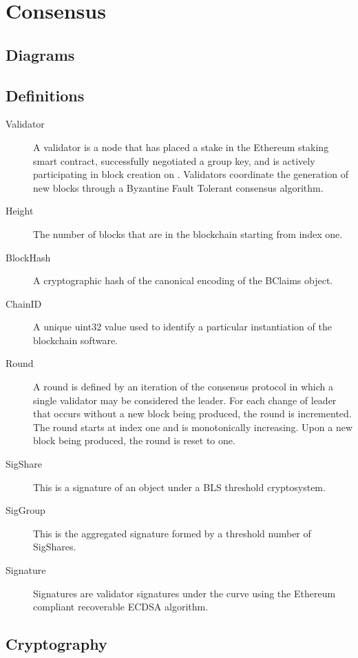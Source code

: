 \section{Consensus}

\subsection{Diagrams}



\subsection{Definitions}

\begin{description}
\item [Validator] A validator is a node that has placed a stake in the
    Ethereum staking smart contract, successfully negotiated a group key,
    and is actively participating in block creation on \LayerTwoLong{}.
    Validators coordinate the generation of new blocks through a
    Byzantine Fault Tolerant consensus algorithm.
\item [Height]
    The number of blocks that are in the blockchain starting from index one.
\item [BlockHash] A cryptographic hash of the canonical encoding
    of the BClaims object.
\item [ChainID] A unique uint32 value used to identify a particular
    instantiation of the \LayerTwoLong{} blockchain software.
\item [Round] A round is defined by an iteration of the consensus
    protocol in which a single validator may be considered the leader.
    For each change of leader that occurs without a new block being
    produced, the round is incremented.
    The round starts at index one and is monotonically increasing.
    Upon a new block being produced, the round is reset to one.
\item [SigShare] This is a signature of an object under a BLS threshold
    cryptosystem.
\item [SigGroup] This is the aggregated signature formed by a threshold
    number of SigShares.
\item [Signature] Signatures are validator signatures under the
    \secp{} curve using the Ethereum compliant recoverable ECDSA algorithm.
\end{description}


\subsection{Cryptography}

